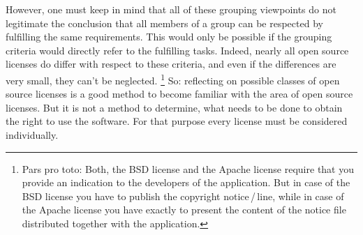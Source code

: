 However, one must keep in mind that all of these grouping viewpoints do not
legitimate the conclusion that all members of a group can be respected by
fulfilling the same requirements. This would only be possible if the grouping
criteria would directly refer to the fulfilling tasks. Indeed, nearly all open
source licenses do differ with respect to these criteria, and even if the
differences are very small, they can't be neglected.%
  \footnote{Pars pro toto:
  Both, the BSD license and the Apache license require that you provide an
  indication to the developers of the application. But in case of the BSD license
  you have to publish the copyright notice\,/\,line, while in case of the Apache
  license you have exactly to present the content of the notice file distributed
  together with the application.} 
So: reflecting on possible classes of open
source licenses is a good method to become familiar with the area of open source
licenses. But it is not a method to determine, what needs to be done to
obtain the right to use the software. For that purpose every license must be
considered individually.



